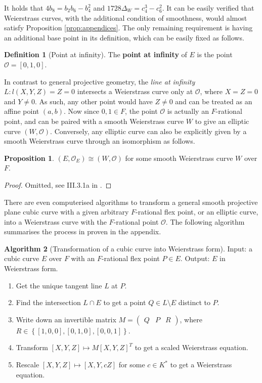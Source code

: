 \documentclass{article}
\newcommand{\rb}[1]{\left( #1 \right)}
\renewcommand{\sb}[1]{\left[ #1 \right]}
\newcommand{\cb}[1]{\left\{ #1 \right\}}
\newcommand{\onebythree}[3]{\begin{pmatrix} #1 & #2 & #3 \end{pmatrix}}
\theoremstyle{definition}
\newtheorem*{definition}{Definition}
\newtheorem{proposition}{Proposition}[subsection]
\newtheorem{algorithm}[proposition]{Algorithm}
\begin{document}
It holds that $ 4b_8 = b_2b_6 - b_4^2 $ and $ 1728\Delta_W = c_4^3 - c_6^2 $. It can be easily verified that Weierstrass curves, with the additional condition of smoothness, would almost satisfy Proposition \ref{prop:appendices}. The only remaining requirement is having an additional base point in its definition, which can be easily fixed as follows.

\begin{definition}[Point at infinity]
The \textbf{point at infinity} of $ E $ is the point $ \mathcal{O} = \sb{0, 1, 0} $.
\end{definition}

In contrast to general projective geometry, the \emph{line at infinity} $ L : l\rb{X, Y, Z} = Z = 0 $ intersects a Weierstrass curve only at $ \mathcal{O} $, where $ X = Z = 0 $ and $ Y \ne 0 $. As such, any other point would have $ Z \ne 0 $ and can be treated as an affine point $ \rb{a, b} $. Now since $ 0, 1 \in F $, the point $ \mathcal{O} $ is actually an $ F $-rational point, and can be paired with a smooth Weierstrass curve $ W $ to give an elliptic curve $ \rb{W, \mathcal{O}} $. Conversely, any elliptic curve can also be explicitly given by a smooth Weierstrass curve through an isomorphism as follows.

\begin{proposition}
$ \rb{E, \mathcal{O}_E} \cong \rb{W, \mathcal{O}} $ for some smooth Weierstrass curve $ W $ over $ F $.
\end{proposition}

\begin{proof}
Omitted, see III.3.1a in \cite{gtm}.
\end{proof}

There are even computerised algorithms to transform a general smooth projective plane cubic curve with a given arbitrary $ F $-rational flex point, or an elliptic curve, into a Weierstrass curve with the $ F $-rational point $ \mathcal{O} $. The following algorithm summarises the process in \cite{weierstrass} proven in the appendix.

\begin{algorithm}[Transformation of a cubic curve into Weierstrass form]
Input: a cubic curve $ E $ over $ F $ with an $ F $-rational flex point $ P \in E $. Output: $ E $ in Weierstrass form.
\begin{enumerate}
\item Get the unique tangent line $ L $ at $ P $.
\item Find the intersection $ L \cap E $ to get a point $ Q \in L \setminus E $ distinct to $ P $.
\item Write down an invertible matrix $ M = \onebythree{Q}{P}{R} $, where $ R \in \cb{\sb{1, 0, 0}, \sb{0, 1, 0}, \sb{0, 0, 1}} $.
\item Transform $ \sb{X, Y, Z} \mapsto M\sb{X, Y, Z}^T $ to get a scaled Weierstrass equation.
\item Rescale $ \sb{X, Y, Z} \mapsto \sb{X, Y, cZ} $ for some $ c \in K^* $ to get a Weierstrass equation.
\end{enumerate}
\end{algorithm}
\end{document}
